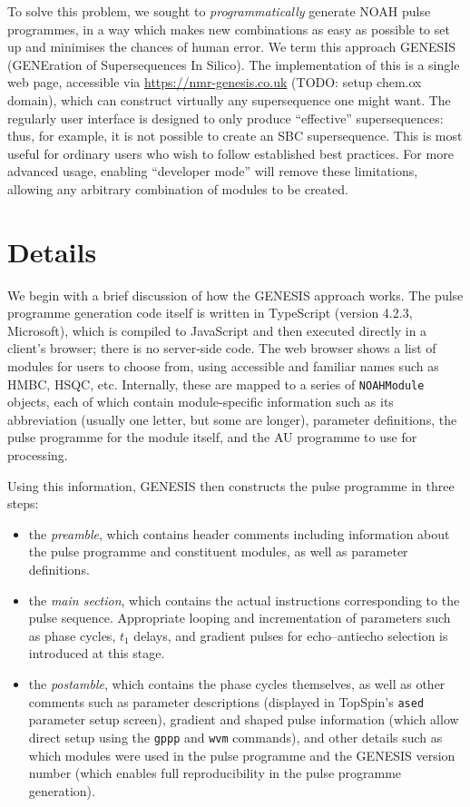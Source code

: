 \documentclass[a4paper,11pt]{article}
\newcommand{\todo}[1]{\textcolor{WildStrawberry}{#1}}
\begin{document}
To solve this problem, we sought to \textit{programmatically} generate NOAH pulse programmes, in a way which makes new combinations as easy as possible to set up and minimises the chances of human error.
We term this approach GENESIS (GENEration of Supersequences In Silico).
The implementation of this is a single web page, accessible via \url{https://nmr-genesis.co.uk} \todo{(TODO: setup chem.ox domain)}, which can construct virtually any supersequence one might want.
The regularly user interface is designed to only produce ``effective'' supersequences: thus, for example, it is not possible to create an SBC supersequence.
This is most useful for ordinary users who wish to follow established best practices.
For more advanced usage, enabling ``developer mode'' will remove these limitations, allowing any arbitrary combination of modules to be created.

\section{Details}

We begin with a brief discussion of how the GENESIS approach works.
The pulse programme generation code itself is written in TypeScript (version 4.2.3, Microsoft), which is compiled to JavaScript and then executed directly in a client's browser; there is no server-side code.
The web browser shows a list of modules for users to choose from, using accessible and familiar names such as HMBC, HSQC, etc.
Internally, these are mapped to a series of \texttt{NOAHModule} objects, each of which contain module-specific information such as its abbreviation (usually one letter, but some are longer), parameter definitions, the pulse programme for the module itself, and the AU programme to use for processing. 

Using this information, GENESIS then constructs the pulse programme in three steps:

\begin{itemize}
    \item the \textit{preamble}, which contains header comments including information about the pulse programme and constituent modules, as well as parameter definitions. 
    \item the \textit{main section}, which contains the actual instructions corresponding to the pulse sequence. Appropriate looping and incrementation of parameters such as phase cycles, $t_1$ delays, and gradient pulses for echo--antiecho selection is introduced at this stage.
    \item the \textit{postamble}, which contains the phase cycles themselves, as well as other comments such as parameter descriptions (displayed in TopSpin's \texttt{ased} parameter setup screen), gradient and shaped pulse information (which allow direct setup using the \texttt{gppp} and \texttt{wvm} commands), and other details such as which modules were used in the pulse programme and the GENESIS version number (which enables full reproducibility in the pulse programme generation).
\end{itemize}
\end{document}
